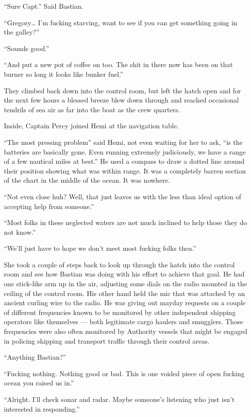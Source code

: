 \documentclass[]{scrbook}
\begin{document}
``Sure Capt.'' Said Bastian.

``Gregory\ldots{} I'm fucking starving, want to see if you can get
something going in the galley?''

``Sounds good.''

``And put a new pot of coffee on too. The shit in there now has been on
that burner so long it looks like bunker fuel.''

They climbed back down into the control room, but left the hatch open
and for the next few hours a blessed breeze blew down through and
reached occasional tendrils of sea air as far into the boat as the crew
quarters.

Inside, Captain Percy joined Hemi at the navigation table.

``The most pressing problem'' said Hemi, not even waiting for her to
ask, ``is the batteries are basically gone. Even running extremely
judiciously, we have a range of a few nautical miles at best.'' He used
a compass to draw a dotted line around their position showing what was
within range. It was a completely barren section of the chart in the
middle of the ocean. It was nowhere.

``Not even close huh? Well, that just leaves us with the less than ideal
option of accepting help from someone.''

``Most folks in these neglected waters are not much inclined to help
those they do not know.''

``We'll just have to hope we don't meet most fucking folks then.''

She took a couple of steps back to look up through the hatch into the
control room and see how Bastian was doing with his effort to achieve
that goal. He had one stick-like arm up in the air, adjusting some dials
on the radio mounted in the ceiling of the control room. His other hand
held the mic that was attached by an ancient curling wire to the radio.
He was giving out mayday requests on a couple of different frequencies
known to be monitored by other independent shipping operators like
themselves --- both legitimate cargo haulers and smugglers. Those
frequencies were also often monitored by Authority vessels that might be
engaged in policing shipping and transport traffic through their control
areas.

``Anything Bastian?''

``Fucking nothing. Nothing good or bad. This is one voided piece of open
fucking ocean you raised us in.''

``Alright. I'll check sonar and radar. Maybe someone's listening who
just isn't interested in responding.''
\end{document}
